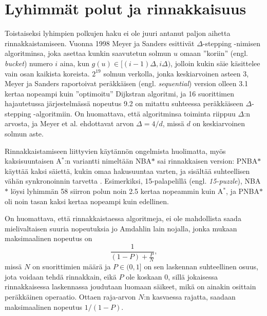 \documentclass[finnish]{tktltiki2}
\theoremstyle{definition}
\theoremstyle{remark}
\begin{document}
\section{Lyhimmät polut ja rinnakkaisuus}
Toistaiseksi lyhimpien polkujen haku ei ole juuri antanut paljon aihetta rinnakkaistamiseen. Vuonna 1998 Meyer ja Sanders esittivät $\Delta$-stepping -nimisen algoritminsa, joka asettaa kunkin saavutetun solmun $u$ omaan ''koriin'' (engl. \textit{bucket}) numero $i$ aina, kun $g(u) \in [(i - 1)\Delta, i\Delta)$, jolloin kukin säie käsittelee vain osan kaikista koreista. $2^{19}$ solmun verkolla, jonka keskiarvoinen asteen 3, Meyer ja Sanders raportoivat peräkkäisen (engl. \textit{sequential}) version olleen 3.1 kertaa nopeampi kuin ''optimoitu'' Dijkstran algoritmi, ja 16 suorittimen hajautetussa järjestelmässä nopeutus 9.2 on mitattu suhteessa peräkkäiseen $\Delta$-stepping -algoritmiin. On huomattava, että algoritminsa toiminta riippuu $\Delta$:n arvosta, ja Meyer et al. ehdottavat arvon $\Delta = 4/d$, missä $d$ on keskiarvoinen solmun aste.

Rinnakkaistamiseen liittyvien käytännön ongelmista huolimatta, myös kaksisuuntaisen A$^{\ast}$:n variantti nimeltään NBA$\ast$ sai rinnakkaisen version: PNBA$\ast$ käyttää kaksi säiettä, kukin omaa hakusuuntaa varten, ja sisältää suhteellisen vähän synkronoinnin tarvetta \cite{Rios}. Esimerkiksi, 15-palapelillä (engl. \textit{15-puzzle}), NBA$\ast$ löysi lyhimmän 58 siirron polun noin 2.5 kertaa nopeammin kuin A$^{\ast}$, ja PNBA$\ast$ oli noin tasan kaksi kertaa nopeampi kuin edellinen.

On huomattava, että rinnakkaistaessa algoritmeja, ei ole mahdollista saada mielivaltaisen suuria nopeutuksia jo Amdahlin lain nojalla, jonka mukaan maksimaalinen nopeutus on
\[
\frac{1}{(1 - P) + \frac{P}{N}},
\]
missä $N$ on suorittimien määrä ja $P \in (0, 1]$ on sen laskennan suhteellinen osuus, jota voidaan tehdä rinnakkain, eikä $P$ ole koskaan 0, sillä jokaisessa rinnakkaisessa laskennassa joudutaan luomaan säikeet, mikä on ainakin osittain peräkkäinen operaatio. Ottaen raja-arvon $N$:n kasvaessa rajatta, saadaan maksimaalinen nopeutus $1 / (1 - P)$.







% 
\end{document}
